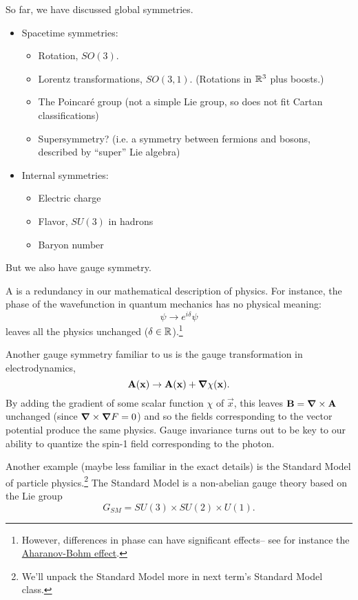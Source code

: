 So far, we have discussed global symmetries.
\begin{itemize}
\item Spacetime symmetries:
\begin{itemize}
\item Rotation, $SO(3)$.
\item Lorentz transformations, $SO(3,1)$. (Rotations in $\mathbb{R}^3$ plus boosts.)
\item The Poincar\'e group (not a simple Lie group, so does not fit Cartan classifications)
\item Supersymmetry? (i.e. a symmetry between fermions and bosons, described by ``super'' Lie algebra)
\end{itemize}
\item Internal symmetries:
\begin{itemize}
\item Electric charge
\item Flavor, $SU(3)$ in hadrons
\item Baryon number
\end{itemize}
\end{itemize}
But we also have gauge symmetry.
\begin{defn}
A  is a redundancy in our mathematical description of physics. For instance, the phase of the wavefunction in quantum mechanics has no physical meaning:
\begin{equation}
\psi\to e^{i\delta}\psi
\end{equation}
leaves all the physics unchanged ($\delta\in \mathbb{R}$).\footnote{However, differences in phase can have significant effects-- see for instance the \href{https://en.wikipedia.org/wiki/Aharonov\%E2\%80\%93Bohm_effect}{Aharanov-Bohm effect}.}
\end{defn}

\begin{exm}
Another gauge symmetry familiar to us is the gauge transformation in electrodynamics,
$$\boldsymbol{\mathbf{A}}(\boldsymbol{\mathbf{x}})\to \boldsymbol{\mathbf{A}}(\boldsymbol{\mathbf{x}})+\mbox{\boldmath$ \nabla $} \chi(\boldsymbol{\mathbf{x}}).$$
By adding the gradient of some scalar function $\chi$ of $\vec{x}$, this leaves $\boldsymbol{\mathbf{B}}=\mbox{\boldmath$ \nabla $} \times \boldsymbol{\mathbf{A}}$ unchanged (since $\mbox{\boldmath$ \nabla $} \times \mbox{\boldmath$ \nabla $} F=0$) and so the fields corresponding to the vector potential produce the same physics. Gauge invariance turns out to be key to our ability to quantize the spin-1 field corresponding to the photon.
\end{exm}
\begin{exm}
Another example (maybe less familiar in the exact details) is the Standard Model of particle physics.\footnote{We'll unpack the Standard Model more in next term's Standard Model class.} The Standard Model is a non-abelian gauge theory based on the Lie group
$$G_{SM}=SU(3)\times SU(2)\times U(1).$$
\end{exm}

